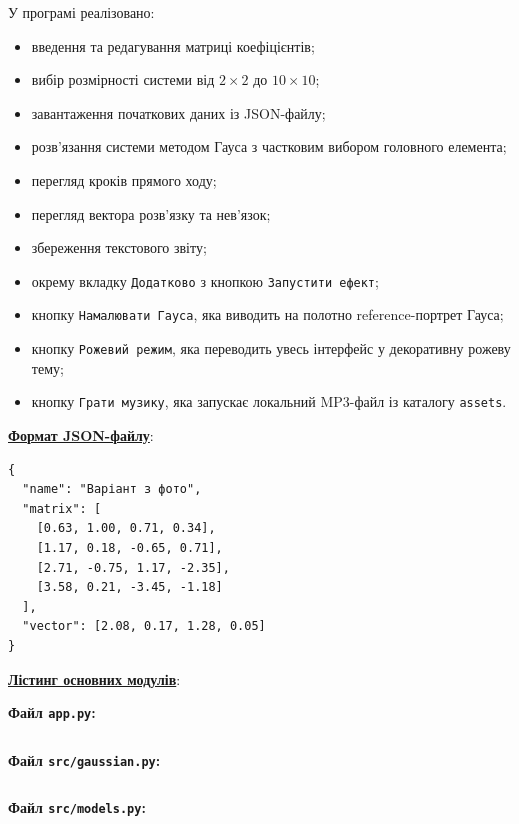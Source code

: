 \documentclass[12pt,a4paper]{article}
\begin{document}
    У програмі реалізовано:
    \begin{itemize}
        \item введення та редагування матриці коефіцієнтів;
        \item вибір розмірності системи від $2\times2$ до $10\times10$;
        \item завантаження початкових даних із JSON-файлу;
        \item розв'язання системи методом Гауса з частковим вибором головного елемента;
        \item перегляд кроків прямого ходу;
        \item перегляд вектора розв'язку та нев'язок;
        \item збереження текстового звіту;
        \item окрему вкладку \texttt{Додатково} з кнопкою \texttt{Запустити ефект};
        \item кнопку \texttt{Намалювати Гауса}, яка виводить на полотно reference-портрет Гауса;
        \item кнопку \texttt{Рожевий режим}, яка переводить увесь інтерфейс у декоративну рожеву тему;
        \item кнопку \texttt{Грати музику}, яка запускає локальний MP3-файл із каталогу \texttt{assets}.
    \end{itemize}

    \vspace{1em}

    \noindent
    \textbf{\underline{Формат JSON-файлу}}:

    \begin{verbatim}
{
  "name": "Варіант з фото",
  "matrix": [
    [0.63, 1.00, 0.71, 0.34],
    [1.17, 0.18, -0.65, 0.71],
    [2.71, -0.75, 1.17, -2.35],
    [3.58, 0.21, -3.45, -1.18]
  ],
  "vector": [2.08, 0.17, 1.28, 0.05]
}
    \end{verbatim}

    \newpage

    \noindent
    \textbf{\underline{Лістинг основних модулів}}:

    \vspace{1em}

    \noindent
    \textbf{Файл \texttt{app.py}:}
    \inputminted{python}{project/app.py}

    \noindent
    \textbf{Файл \texttt{src/gaussian.py}:}
    \inputminted{python}{project/src/gaussian.py}

    \noindent
    \textbf{Файл \texttt{src/models.py}:}
    \inputminted{python}{project/src/models.py}
\end{document}
